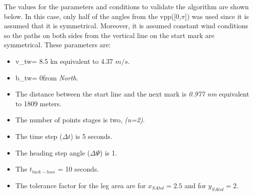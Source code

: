 The values for the parameters and conditions to validate the algorithm are shown below. In this case, only half of the angles from the \acrshort{vpp}([0,$\pi$]) was used since it is assumed that it is symmetrical. Moreover, it is assumed constant wind conditions so the paths on both sides from the vertical line on the start mark are symmetrical. These parameters are:
\begin{itemize}
    \item \acrshort{v_tw}= 8.5 kn equivalent to 4.37 $ m/s $.
    \item \acrshort{b_tw}= 0\degree  from \textit{North}. 
    \item The distance between the start line and the next mark is \textit{0.977 nm} equivalent to 1809 meters. %
    \item The number of points stages is two, \textit{(n=2)}.
    \item The time step ($\Delta t$) is 5 seconds.
    \item The heading step angle ($\Delta \Psi$) is 1\degree. %
    \item The $t_{tack-loss}$ = 10 seconds.
    \item The tolerance factor for the leg area are for $x_{SAtol}=2.5$ and for $y_{SAtol}=2$.
\end{itemize}

